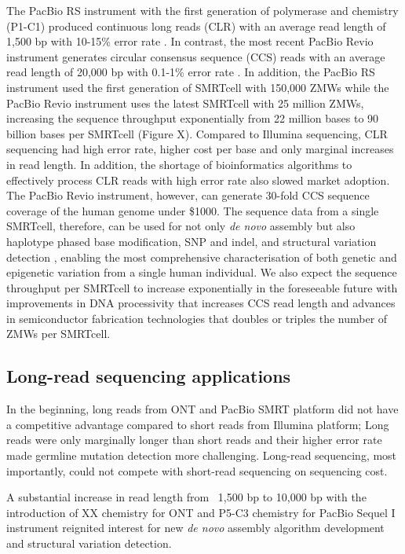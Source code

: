 The PacBio RS instrument with the first generation of polymerase and chemistry (P1-C1) produced continuous long reads (CLR) with an average read length of 1,500 bp with 10-15\% error rate \cite{}. In contrast, the most recent PacBio Revio instrument generates circular consensus sequence (CCS) reads with an average read length of 20,000 bp with 0.1-1\% error rate \cite{}. In addition, the PacBio RS instrument used the first generation of SMRTcell with 150,000 ZMWs \cite{} while the PacBio Revio instrument uses the latest SMRTcell with 25 million ZMWs, increasing the sequence throughput exponentially from 22 million bases to 90 billion bases per SMRTcell \cite{} (Figure X). Compared to Illumina sequencing, CLR sequencing had high error rate, higher cost per base and only marginal increases in read length. In addition, the shortage of bioinformatics algorithms to effectively process CLR reads with high error rate also slowed market adoption. The PacBio Revio instrument, however, can generate 30-fold CCS sequence coverage of the human genome under \$1000. The sequence data from a single SMRTcell, therefore, can be used for not only \textit{de novo} assembly \cite{} but also haplotype phased base modification\cite{}, SNP and indel, \cite{} and structural variation detection \cite{}, enabling the most comprehensive characterisation of both genetic and epigenetic variation from a single human individual. We also expect the sequence throughput per SMRTcell to increase exponentially in the foreseeable future with improvements in DNA processivity that increases CCS read length and advances in semiconductor fabrication technologies that doubles or triples the number of ZMWs per SMRTcell. 

\subsection{Long-read sequencing applications}

In the beginning, long reads from ONT and PacBio SMRT platform did not have a competitive advantage compared to short reads from Illumina platform; Long reads were only marginally longer than short reads and their higher error rate made germline mutation detection more challenging. Long-read sequencing, most importantly, could not compete with short-read sequencing on sequencing cost. 

A substantial increase in read length from ~1,500 bp to 10,000 bp with the introduction of XX chemistry for ONT and P5-C3 chemistry for PacBio Sequel I instrument reignited interest for new \textit{de novo} assembly algorithm development and structural variation detection. 

